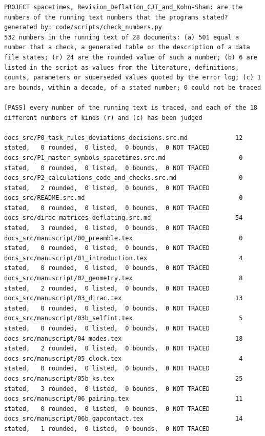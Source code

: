 \documentclass[
  10pt,
]{article}
\begin{document}
\begin{verbatim}
PROJECT spacetimes, Revision_Deflation_CJT_and_Kohn-Sham: are the numbers of the running text numbers that the programs stated?
generated by: code/scripts/check_numbers.py
532 numbers in the running text of 28 documents: (a) 501 equal a number that a check, a generated table or the description of a data file states; (r) 24 are the rounded value of such a number; (b) 6 are listed in the script as values from the literature, definitions, counts, parameters or superseded values quoted by the error log; (c) 1 are bounds, within a decade, of a stated number; 0 could not be traced

[PASS] every number of the running text is traced, and each of the 18 different numbers of kinds (r) and (c) has been judged

docs_src/P0_task_rules_deviations_decisions.src.md             12 stated,   0 rounded,  0 listed,  0 bounds,  0 NOT TRACED
docs_src/P1_master_symbols_spacetimes.src.md                    0 stated,   0 rounded,  0 listed,  0 bounds,  0 NOT TRACED
docs_src/P2_calculations_code_and_checks.src.md                 0 stated,   2 rounded,  0 listed,  0 bounds,  0 NOT TRACED
docs_src/README.src.md                                          0 stated,   0 rounded,  0 listed,  0 bounds,  0 NOT TRACED
docs_src/dirac matrices deflating.src.md                       54 stated,   3 rounded,  0 listed,  0 bounds,  0 NOT TRACED
docs_src/manuscript/00_preamble.tex                             0 stated,   0 rounded,  0 listed,  0 bounds,  0 NOT TRACED
docs_src/manuscript/01_introduction.tex                         4 stated,   0 rounded,  0 listed,  0 bounds,  0 NOT TRACED
docs_src/manuscript/02_geometry.tex                             8 stated,   2 rounded,  0 listed,  0 bounds,  0 NOT TRACED
docs_src/manuscript/03_dirac.tex                               13 stated,   0 rounded,  0 listed,  0 bounds,  0 NOT TRACED
docs_src/manuscript/03b_selfint.tex                             5 stated,   0 rounded,  0 listed,  0 bounds,  0 NOT TRACED
docs_src/manuscript/04_modes.tex                               18 stated,   2 rounded,  0 listed,  0 bounds,  0 NOT TRACED
docs_src/manuscript/05_clock.tex                                4 stated,   0 rounded,  0 listed,  0 bounds,  0 NOT TRACED
docs_src/manuscript/05b_ks.tex                                 25 stated,   3 rounded,  0 listed,  0 bounds,  0 NOT TRACED
docs_src/manuscript/06_pairing.tex                             11 stated,   0 rounded,  0 listed,  0 bounds,  0 NOT TRACED
docs_src/manuscript/06b_gapcontact.tex                         14 stated,   1 rounded,  0 listed,  0 bounds,  0 NOT TRACED

\end{verbatim}
\end{document}
